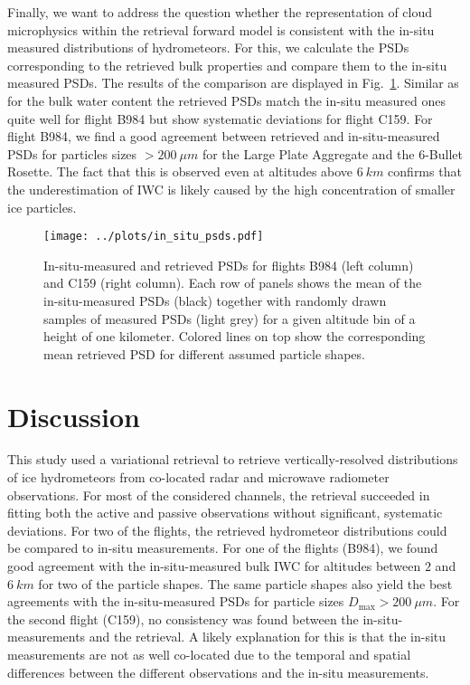 \documentclass[journal abbreviation, manuscript]{copernicus}
\begin{document}
Finally, we want to address the question whether the representation of cloud
microphysics within the retrieval forward model is consistent with the in-situ
measured distributions of hydrometeors. For this, we calculate the PSDs
corresponding to the retrieved bulk properties and compare them to the in-situ
measured PSDs. The results of the comparison are displayed in
Fig.~\ref{fig:in_situ_psds}. Similar as for the bulk water content the retrieved
PSDs match the in-situ measured ones quite well for flight B984 but show
systematic deviations for flight C159. For flight B984, we find a good agreement
between retrieved and in-situ-measured PSDs for particles sizes $> 200
\ \unit{\mu m}$ for the Large Plate Aggregate and the 6-Bullet Rosette. The fact
that this is observed even at altitudes above $6 \ \unit{km}$ confirms that the
underestimation of IWC is likely caused by the high concentration of smaller ice
particles.

\begin{figure}[!hbpt]
  \centering
  \texttt{[image: ../plots/in\_situ\_psds.pdf]}
  \caption{In-situ-measured and retrieved PSDs for flights B984 (left column)
    and C159 (right column). Each row of panels shows the mean of the
    in-situ-measured PSDs (black) together with randomly drawn samples of
    measured PSDs (light grey) for a given altitude bin of a height of one
    kilometer. Colored lines on top show the corresponding mean retrieved PSD
    for different assumed particle shapes.}
  \label{fig:in_situ_psds}
\end{figure}

\section{Discussion}
\label{sec:discussion}

This study used a variational retrieval to retrieve vertically-resolved
distributions of ice hydrometeors from co-located radar and microwave radiometer
observations. For most of the considered channels, the retrieval succeeded in
fitting both the active and passive observations without significant, systematic
deviations. For two of the flights, the retrieved hydrometeor distributions
could be compared to in-situ measurements. For one of the flights (B984), we
found good agreement with the in-situ-measured bulk IWC for altitudes between
$2$ and $6\ \unit{km}$ for two of the particle shapes. The same particle shapes
also yield the best agreements with the in-situ-measured PSDs for particle sizes
$D_\text{max} > 200\ \unit{\mu m}$. For the second flight (C159), no consistency
was found between the in-situ-measurements and the retrieval. A likely
explanation for this is that the in-situ measurements are not as well co-located
due to the temporal and spatial differences between the different observations
and the in-situ measurements.
\end{document}
